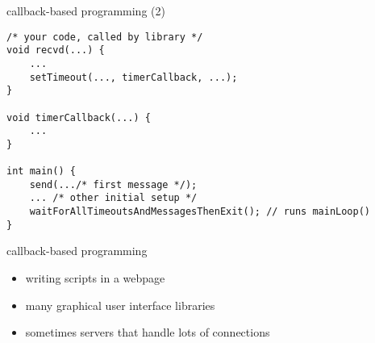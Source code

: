 \begin{frame}[fragile]{callback-based programming (2)}
\begin{Verbatim}[fontsize=\small]
/* your code, called by library */
void recvd(...) {
    ...
    setTimeout(..., timerCallback, ...);
}

void timerCallback(...) {
    ...
}

int main() {
    send(.../* first message */);
    ... /* other initial setup */
    waitForAllTimeoutsAndMessagesThenExit(); // runs mainLoop()
}
\end{Verbatim}
\end{frame}


\begin{frame}{callback-based programming}
    \begin{itemize}
    \item writing scripts in a webpage
    \item many graphical user interface libraries
    \item sometimes servers that handle lots of connections
    \end{itemize}
\end{frame}

